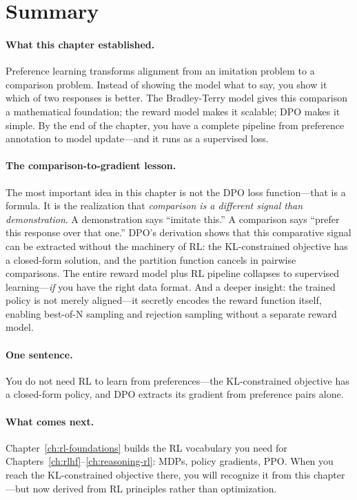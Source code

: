 \section*{Summary}

\paragraph{What this chapter established.} Preference learning transforms alignment from an imitation problem to a comparison problem. Instead of showing the model what to say, you show it which of two responses is better. The Bradley-Terry model gives this comparison a mathematical foundation; the reward model makes it scalable; DPO makes it simple. By the end of the chapter, you have a complete pipeline from preference annotation to model update---and it runs as a supervised loss.

\paragraph{The comparison-to-gradient lesson.} The most important idea in this chapter is not the DPO loss function---that is a formula. It is the realization that \emph{comparison is a different signal than demonstration}. A demonstration says ``imitate this.'' A comparison says ``prefer this response over that one.'' DPO's derivation shows that this comparative signal can be extracted without the machinery of RL: the KL-constrained objective has a closed-form solution, and the partition function cancels in pairwise comparisons. The entire reward model plus RL pipeline collapses to supervised learning---\emph{if} you have the right data format. And a deeper insight: the trained policy is not merely aligned---it secretly encodes the reward function itself, enabling best-of-N sampling and rejection sampling without a separate reward model.

\paragraph{One sentence.} You do not need RL to learn from preferences---the KL-constrained objective has a closed-form policy, and DPO extracts its gradient from preference pairs alone.

\paragraph{What comes next.} Chapter~\ref{ch:rl-foundations} builds the RL vocabulary you need for Chapters~\ref{ch:rlhf}--\ref{ch:reasoning-rl}: MDPs, policy gradients, PPO. When you reach the KL-constrained objective there, you will recognize it from this chapter---but now derived from RL principles rather than optimization.



